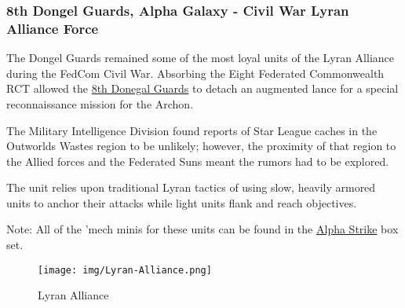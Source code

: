 \subsubsection{8th Dongel Guards, Alpha Galaxy - Civil War Lyran Alliance Force}

The Dongel Guards remained some of the most loyal units of the Lyran Alliance during the FedCom Civil War.
Absorbing the Eight Federated Commonwealth RCT allowed the \href{https://www.sarna.net/wiki/8th_Donegal_Guards}{8th Donegal Guards} to detach an augmented lance for a special reconnaissance mission for the Archon.

The Military Intelligence Division found reports of Star League caches in the Outworlds Wastes region to be unlikely; however, the proximity of that region to the Allied forces and the Federated Suns meant the rumors had to be explored.

The unit relies upon traditional Lyran tactics of using slow, heavily armored units to anchor their attacks while light units flank and reach objectives.
          	
Note: All of the 'mech minis for these units can be found in the \href{https://www.sarna.net/wiki/Alpha_Strike_Boxed_Set}{Alpha Strike} box set.

\begin{figure}[!h]
  \centering
  \texttt{[image: img/Lyran-Alliance.png]}
  \caption*{Lyran Alliance}
\end{figure}

